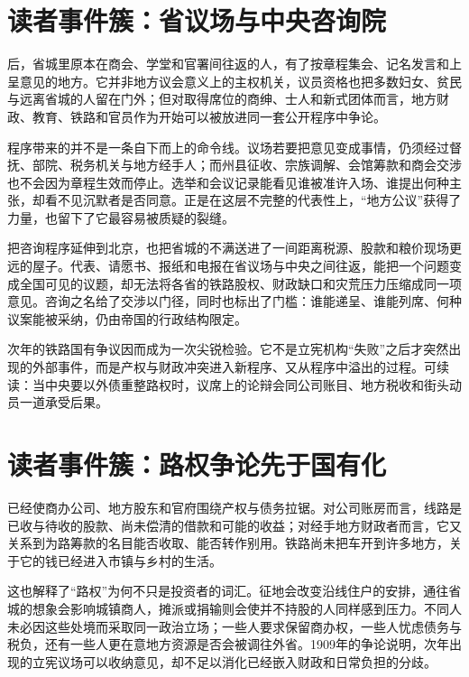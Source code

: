 \section{读者事件簇：省议场与中央咨询院}

后，省城里原本在商会、学堂和官署间往返的人，有了按章程集会、记名发言和上呈意见的地方。它并非地方议会意义上的主权机关，议员资格也把多数妇女、贫民与远离省城的人留在门外；但对取得席位的商绅、士人和新式团体而言，地方财政、教育、铁路和官员作为开始可以被放进同一套公开程序中争论。

程序带来的并不是一条自下而上的命令线。议场若要把意见变成事情，仍须经过督抚、部院、税务机关与地方经手人；而州县征收、宗族调解、会馆筹款和商会交涉也不会因为章程生效而停止。选举和会议记录能看见谁被准许入场、谁提出何种主张，却看不见沉默者是否同意。正是在这层不完整的代表性上，“地方公议”获得了力量，也留下了它最容易被质疑的裂缝。

把咨询程序延伸到北京，也把省城的不满送进了一间距离税源、股款和粮价现场更远的屋子。代表、请愿书、报纸和电报在省议场与中央之间往返，能把一个问题变成全国可见的议题，却无法将各省的铁路股权、财政缺口和灾荒压力压缩成同一项意见。咨询之名给了交涉以门径，同时也标出了门槛：谁能递呈、谁能列席、何种议案能被采纳，仍由帝国的行政结构限定。

次年的铁路国有争议因而成为一次尖锐检验。它不是立宪机构“失败”之后才突然出现的外部事件，而是产权与财政冲突进入新程序、又从程序中溢出的过程。可续读：当中央要以外债重整路权时，议席上的论辩会同公司账目、地方税收和街头动员一道承受后果。

\section{读者事件簇：路权争论先于国有化}

已经使商办公司、地方股东和官府围绕产权与债务拉锯。对公司账房而言，线路是已收与待收的股款、尚未偿清的借款和可能的收益；对经手地方财政者而言，它又关系到为路筹款的名目能否收取、能否转作别用。铁路尚未把车开到许多地方，关于它的钱已经进入市镇与乡村的生活。

这也解释了“路权”为何不只是投资者的词汇。征地会改变沿线住户的安排，通往省城的想象会影响城镇商人，摊派或捐输则会使并不持股的人同样感到压力。不同人未必因这些处境而采取同一政治立场；一些人要求保留商办权，一些人忧虑债务与税负，还有一些人更在意地方资源是否会被调往外省。1909年的争论说明，次年出现的立宪议场可以收纳意见，却不足以消化已经嵌入财政和日常负担的分歧。


